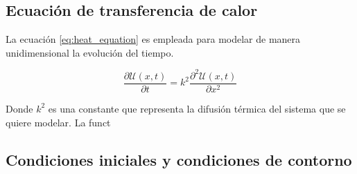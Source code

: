 \subsection{Ecuación de transferencia de calor}

La ecuación \ref{eq:heat_equation} es empleada para modelar de manera unidimensional la evolución del tiempo.

\begin{equation}
    \frac{\partial \mathcal{U}(x,t)}{\partial t} = k^2 \frac{\partial^2 \mathcal{U}(x,t)}{\partial x^2} \label{eq:heat_equation}
\end{equation}

Donde $k^2$ es una constante que representa la difusión térmica del sistema que se quiere modelar. La funct

\subsection{Condiciones iniciales y condiciones de contorno}